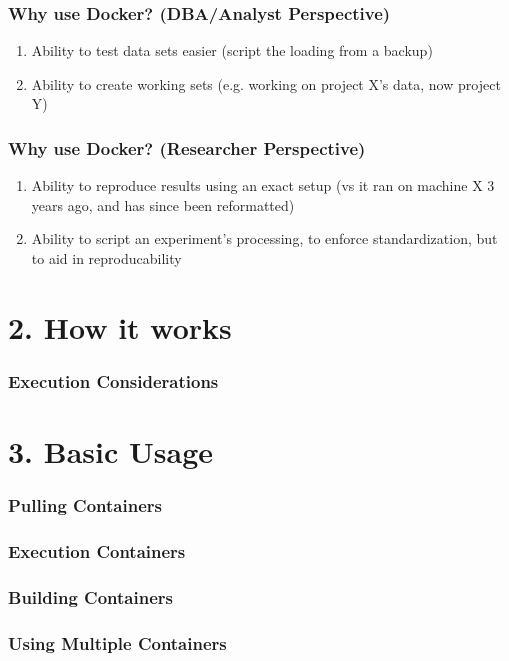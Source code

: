 \documentclass{beamer}
\begin{document}
\begin{frame}
    \frametitle{Why use Docker? (DBA/Analyst Perspective)}
    \begin{enumerate}
        \item Ability to test data sets easier (script the loading from a backup)
        \item Ability to create working sets (e.g. working on project X's data, now project Y)
    \end{enumerate}
\end{frame}

\begin{frame}
    \frametitle{Why use Docker? (Researcher Perspective)}
    \begin{enumerate}
        \item Ability to reproduce results using an exact setup (vs it ran on machine X 3 years ago, and has since been reformatted)
        \item Ability to script an experiment's processing, to enforce standardization, but to aid in reproducability
    \end{enumerate}
\end{frame}

\section{2. How it works}
\begin{frame}
    \frametitle{Execution Considerations}
\end{frame}

\section{3. Basic Usage}
\begin{frame}
    \frametitle{Pulling Containers}
\end{frame}

\begin{frame}
    \frametitle{Execution Containers}
\end{frame}

\begin{frame}
    \frametitle{Building Containers}
\end{frame}

\begin{frame}
    \frametitle{Using Multiple Containers}
\end{frame}
\end{document}
